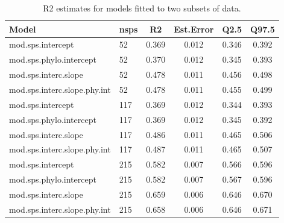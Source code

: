 \documentclass{article}\usepackage[]{graphicx}\usepackage[]{color}
\begin{document}
\begin{table}[H]
  \begin{center}

\caption{R2 estimates for models fitted to two subsets of data.}
\begin{tabular}{@{}llcccc@{}}
\toprule
Model                        & nsps & R2    & Est.Error & Q2.5  & Q97.5 \\ \midrule
mod.sps.intercept            & 52   & 0.369 & 0.012     & 0.346 & 0.392 \\
mod.sps.phylo.intercept      & 52   & 0.370 & 0.012     & 0.345 & 0.393 \\
mod.sps.interc.slope         & 52   & 0.478 & 0.011     & 0.456 & 0.498 \\
mod.sps.interc.slope.phy.int & 52   & 0.478 & 0.011     & 0.455 & 0.499 \\
mod.sps.intercept            & 117  & 0.369 & 0.012     & 0.344 & 0.393 \\
mod.sps.phylo.intercept      & 117  & 0.369 & 0.012     & 0.345 & 0.392 \\
mod.sps.interc.slope         & 117  & 0.486 & 0.011     & 0.465 & 0.506 \\
mod.sps.interc.slope.phy.int & 117  & 0.487 & 0.011     & 0.465 & 0.507 \\
mod.sps.intercept            & 215  & 0.582 & 0.007     & 0.566 & 0.596 \\
mod.sps.phylo.intercept      & 215  & 0.582 & 0.007     & 0.567 & 0.596 \\
mod.sps.interc.slope         & 215  & 0.659 & 0.006     & 0.646 & 0.670 \\
mod.sps.interc.slope.phy.int & 215  & 0.658 & 0.006     & 0.646 & 0.671 \\ \bottomrule
\end{tabular}
 \label{table:R2table}
  \end{center}

 \end{table}
\end{document}
